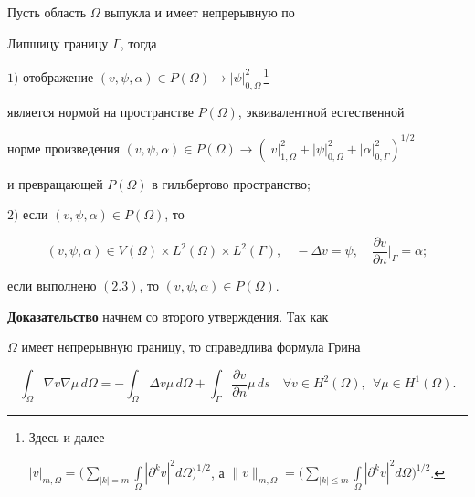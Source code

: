 \begin{thm} 


Пусть область $\Omega$ выпукла и имеет непрерывную по 


Липшицу границу $\Gamma$, тогда 


 


$1)$ отображение $(v,\psi,\alpha)\in P(\Omega)\to 


|\psi|^2_{0,\Omega}$\,\footnote{Здесь и далее 


$|v|_{m,\Omega}=\Big(\sum\limits_{|k|=m} \int\limits_\Omega |\partial^k 


v|^2d\Omega\Big)^{1/2}$, а $\|v\|_{m,\Omega}=\Big( \sum\limits_{|k|\le 


m}\int\limits_\Omega |\partial^k v|^2d\Omega \Big)^{1/2}$.} 


является нормой на пространстве $P(\Omega)$, эквивалентной естественной 


норме произведения $(v,\psi,\alpha)\in P(\Omega)\to (|v|^2_{1,\Omega}+ 


|\psi|^2_{0,\Omega}+ |\alpha|^2_{0,\Gamma})^{1/2}$ 


и превращающей $P(\Omega)$ в гильбертово пространство\/$;$ 


 


$2)$ если $(v,\psi,\alpha)\in P(\Omega)$, то 


\begin{equation} 


(v,\psi,\alpha)\in V(\Omega)\times L^2(\Omega)\times L^2(\Gamma), 


\quad -\Delta v=\psi,\quad \frac{\partial v}{\partial n} 


\Big|_\Gamma=\alpha; 


\end{equation} 


 


если выполнено $(2.3)$, то $(v,\psi,\alpha)\in P(\Omega)$. 


\end{thm} 


 


 


{\bf Доказательство} начнем со второго утверждения. Так как 


$\Omega$ имеет непрерывную границу, то справедлива формула Грина 


\begin{equation} 


\int_\Omega \nabla v\nabla\mu\,d\Omega=-\int_\Omega 


\Delta v\mu\,d\Omega+\int_\Gamma\frac{\partial v}{\partial n} 


\mu\,ds\quad \forall v\in H^2(\Omega),\ \ \forall\mu\in H^1(\Omega). 


\end{equation} 


